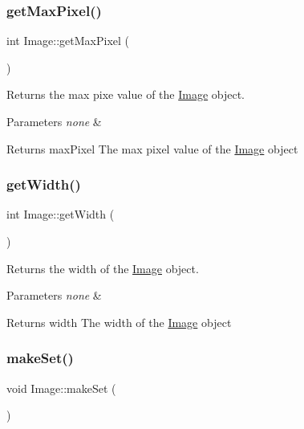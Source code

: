 \subsubsection{\texorpdfstring{get\+Max\+Pixel()}{getMaxPixel()}}
{\footnotesize\ttfamily int Image\+::get\+Max\+Pixel (\begin{DoxyParamCaption}{ }\end{DoxyParamCaption})}

Returns the max pixe value of the \hyperlink{class_image}{Image} object.


\begin{DoxyParams}{Parameters}
{\em none} & \\
\hline
\end{DoxyParams}
\begin{DoxyReturn}{Returns}
max\+Pixel The max pixel value of the \hyperlink{class_image}{Image} object 
\end{DoxyReturn}
\mbox{\label{class_image_af2720a072812763395512fc3c8c21362}} 
\subsubsection{\texorpdfstring{get\+Width()}{getWidth()}}
{\footnotesize\ttfamily int Image\+::get\+Width (\begin{DoxyParamCaption}{ }\end{DoxyParamCaption})}

Returns the width of the \hyperlink{class_image}{Image} object.


\begin{DoxyParams}{Parameters}
{\em none} & \\
\hline
\end{DoxyParams}
\begin{DoxyReturn}{Returns}
width The width of the \hyperlink{class_image}{Image} object 
\end{DoxyReturn}
\mbox{\label{class_image_a50edfdcc8b618d34496d035cfd1cad28}} 
\subsubsection{\texorpdfstring{make\+Set()}{makeSet()}}
{\footnotesize\ttfamily void Image\+::make\+Set (\begin{DoxyParamCaption}{ }\end{DoxyParamCaption})}

